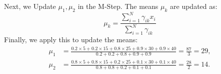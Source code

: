 \documentclass[10pt]{article}
\begin{document}
Next, we Update \( \mu_1, \mu_2 \) in the M-Step. The means \(\mu_k\) are updated as:
\begin{equation}
    \mu_k = \frac{\sum_{i=1}^{N} \gamma_{ik}x_i}{\sum_{i=1}^{N} \gamma_{ik}}
\end{equation}
Finally, we apply this to update the means: \\
\begin{align*}
    \mu_1 &= \frac{0.2 \times 5 + 0.2 \times 15 + 0.8 \times 25 + 0.9 \times 30 + 0.9 \times 40}{0.2 + 0.2 + 0.8 + 0.9 + 0.9} = \frac{87}{3} = 29, \\
    \mu_2 &= \frac{0.8 \times 5 + 0.8 \times 15 + 0.2 \times 25 + 0.1 \times 30 + 0.1 \times 40}{0.8 + 0.8 + 0.2 + 0.1 + 0.1} = \frac{28}{2} = 14.
\end{align*}
\end{document}
